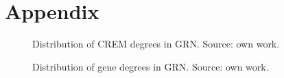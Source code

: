 \documentclass[pdftex,12pt,a4paper]{report}
\begin{document}
\medskip
\clearpage



\pagebreak
\appendix
\chapter{Appendix}
\begin{figure}[!ht]
\begin{center}
	\caption{Distribution of CREM degrees in GRN. Source: own work.}
	\label{crem_degree}
\end{center}
\end{figure}

\begin{figure}[!ht]
\begin{center}
	\caption{Distribution of gene degrees in GRN. Source: own work.}
	\label{gene_degree}
\end{center}
\end{figure}
\end{document}
